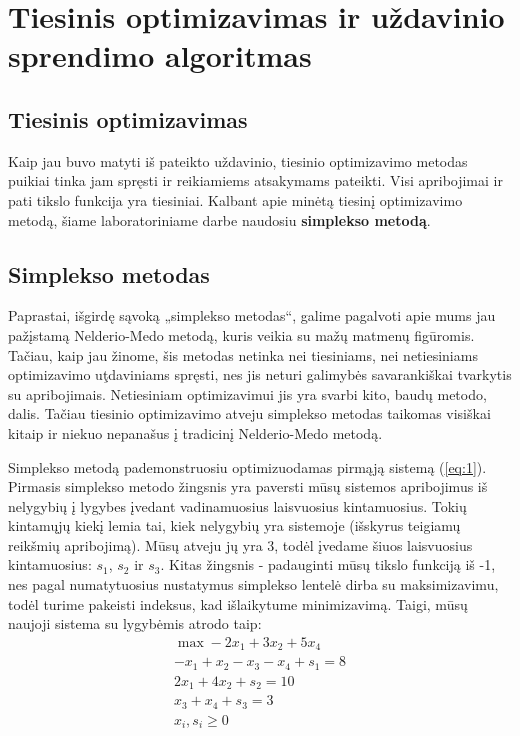\documentclass{article}
\begin{document}
\section{Tiesinis optimizavimas ir uždavinio sprendimo algoritmas}
\subsection{Tiesinis optimizavimas}
Kaip jau buvo matyti iš pateikto uždavinio, tiesinio optimizavimo metodas puikiai tinka jam spręsti ir reikiamiems atsakymams pateikti. Visi apribojimai ir pati tikslo funkcija yra tiesiniai. Kalbant apie minėtą tiesinį optimizavimo metodą, šiame laboratoriniame darbe naudosiu \textbf{simplekso metodą}.
\subsection{Simplekso metodas}
Paprastai, išgirdę sąvoką „simplekso metodas“, galime pagalvoti apie mums jau pažįstamą Nelderio-Medo metodą, kuris veikia su mažų matmenų figūromis. Tačiau, kaip jau žinome, šis metodas netinka nei tiesiniams, nei netiesiniams optimizavimo uţdaviniams spręsti, nes jis neturi galimybės savarankiškai tvarkytis su apribojimais. Netiesiniam optimizavimui jis yra svarbi kito, baudų metodo, dalis. Tačiau tiesinio optimizavimo atveju simplekso metodas taikomas visiškai kitaip ir niekuo nepanašus į tradicinį Nelderio-Medo metodą.

Simplekso metodą pademonstruosiu optimizuodamas pirmąją sistemą (\ref{eq:1}). Pirmasis simplekso metodo žingsnis yra paversti mūsų sistemos apribojimus iš nelygybių į lygybes įvedant vadinamuosius laisvuosius kintamuosius. Tokių kintamųjų kiekį lemia tai, kiek nelygybių yra sistemoje (išskyrus teigiamų reikšmių apribojimą). Mūsų atveju jų yra 3, todėl įvedame šiuos laisvuosius kintamuosius: $s_1$, $s_2$ ir $s_3$. Kitas žingsnis - padauginti mūsų tikslo funkciją iš -1, nes pagal numatytuosius nustatymus simplekso lentelė dirba su maksimizavimu, todėl turime pakeisti indeksus, kad išlaikytume minimizavimą. Taigi, mūsų naujoji sistema su lygybėmis atrodo taip:
\begin{equation*}
    \begin{split}
        \max -2x_{1}+3x_{2}+5x_{4} \\
        -x_{1}+x_{2}-x_{3}-x_{4}+s_1=8\\
        2x_{1}+4x_{2}+s_2=10\\
        x_{3}+x_{4}+s_3=3\\
        x_{i}, s_{i}\geq0
    \end{split}
\end{equation*}
\end{document}
